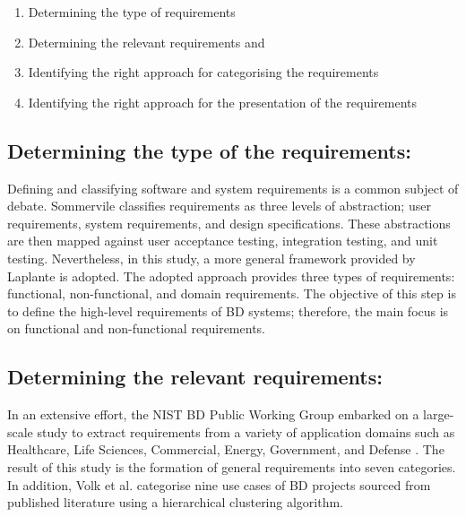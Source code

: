\documentclass[preprint,12pt]{elsarticle}
\begin{document}
\begin{enumerate}

    \item Determining the type of requirements 

    \item Determining the relevant requirements and 

    \item Identifying the right approach for categorising the requirements 

    \item Identifying the right approach for the presentation of the requirements 

\end{enumerate}

\subsection{Determining the type of the requirements:}

Defining and classifying software and system requirements is a common subject of debate. Sommervile \cite{sommerville2011software} classifies requirements as three levels of abstraction; user requirements, system requirements, and design specifications. These abstractions are then mapped against user acceptance testing, integration testing, and unit testing. Nevertheless, in this study, a more general framework provided by Laplante \cite{laplante2017requirements} is adopted. The adopted approach provides three types of requirements: functional, non-functional, and domain requirements. The objective of this step is to define the high-level requirements of BD systems; therefore, the main focus is on functional and non-functional requirements. 

\subsection{Determining the relevant requirements:}

In an extensive effort, the NIST BD Public Working Group embarked on a large-scale study to extract requirements from a variety of application domains such as Healthcare, Life Sciences, Commercial, Energy, Government, and Defense \cite{Chang}. The result of this study is the formation of general requirements into seven categories. In addition, Volk et al. \cite{volk2020identifying} categorise nine use cases of BD projects sourced from published literature using a hierarchical clustering algorithm. 
\end{document}
